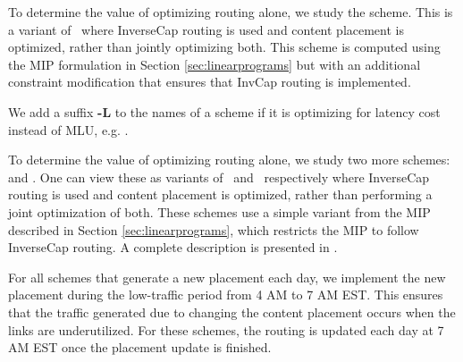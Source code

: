 To determine the value of optimizing routing alone, we study the \textbf{\invoptpfuture} scheme. This is a variant of \optrpfuture\ where InverseCap routing is used and content placement is optimized, rather than jointly optimizing both. This scheme is computed  using the MIP formulation in Section \ref{sec:linearprograms} but with an additional constraint modification that ensures that InvCap routing is implemented.


We add a suffix  \textbf{-L} to the names of a scheme if it is optimizing for latency cost instead of MLU, e.g. \textbf{\optrpl}.




\eat
{
To determine the value of optimizing routing alone, we study two more schemes: \textbf{\invoptp}  and \textbf{\invoptpfuture}. One can view these as variants of \optrp\  and \optrpfuture\ respectively where InverseCap routing is used and content placement is optimized, rather than performing a joint optimization of both. These schemes use a simple variant  from the MIP described in Section \ref{sec:linearprograms}, which restricts the MIP to follow InverseCap routing. A complete description is presented in  \cite{techreport}.
}


For all schemes that generate a new placement each day, we implement the new placement during the low-traffic period from 4 AM to 7 AM EST. This ensures that the traffic generated due to changing the content placement occurs when the links are underutilized. For these schemes, the routing is updated each day at 7 AM EST once the placement update is finished. %


